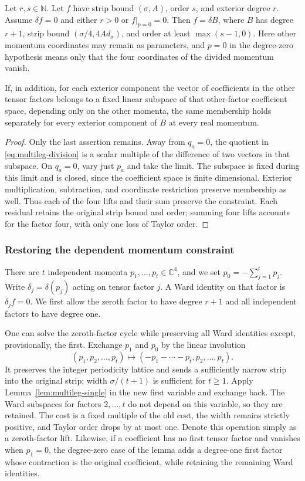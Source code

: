 \begin{lemma}\label{lem:multileg-single}
Let $r,s\in\mathbb N$. Let $f$ have strip bound $(\sigma,A)$,
order $s$, and exterior degree $r$. Assume $\delta f=0$ and either $r>0$ or $f|_{p=0}=0$.
Then $f=\delta B$, where $B$ has degree $r+1$, strip bound
$(\sigma/4,4Ad_\sigma)$, and order at least $\max(s-1,0)$.
Here other momentum coordinates may remain as parameters, and
$p=0$ in the degree-zero hypothesis means only that the four
coordinates of the divided momentum vanish.

If, in addition, for each exterior component the vector of
coefficients in the other tensor factors belongs to a fixed
linear subspace of that other-factor coefficient space, depending
only on the other momenta, the same membership holds separately
for every exterior component of $B$ at every real momentum.
\end{lemma}
\begin{proof}
Only the last assertion remains. Away from $q_a=0$, the quotient
in \eqref{eq:multileg-division} is a scalar multiple of the
difference of two vectors in that subspace. On $q_a=0$, vary just
$p_a$ and take the limit. The subspace is fixed during this limit
and is closed, since the coefficient space is finite dimensional.
Exterior multiplication, subtraction, and coordinate restriction
preserve membership as well. Thus each of the four lifts and
their sum preserve the constraint. Each residual retains the
original strip bound and order; summing four lifts accounts for
the factor four, with only one loss of Taylor order.
\end{proof}

\subsubsection{Restoring the dependent momentum constraint}
There are $t$ independent momenta $p_1,\ldots,p_t\in\mathbb C^4$,
and we set $p_0=-\sum_{j=1}^t p_j$. Write $\delta_j=\delta(p_j)$
acting on tensor factor $j$. A Ward identity on that factor is
$\delta_j f=0$. We first allow the zeroth factor to have degree
$r+1$ and all independent factors to have degree one.

One can solve the zeroth-factor cycle while preserving all Ward
identities except, provisionally, the first. Exchange $p_1$ and
$p_0$ by the linear involution
\[
 (p_1,p_2,\ldots,p_t)\longmapsto
             (-p_1-\cdots-p_t,p_2,\ldots,p_t).
\]
It preserves the integer periodicity lattice and sends a sufficiently
narrow strip into the original strip; width $\sigma/(t+1)$ is
sufficient for $t\ge1$. Apply Lemma~\ref{lem:multileg-single}
in the new first variable and exchange back. The Ward subspaces
for factors $2,\ldots,t$ do not depend on this variable, so they
are retained. The cost is a fixed multiple of the old cost,
the width remains strictly positive, and Taylor order drops by
at most one. Denote this operation simply as a zeroth-factor lift.
Likewise, if a coefficient has no first tensor factor and vanishes
when $p_1=0$, the degree-zero case of the lemma adds a degree-one
first factor whose contraction is the original coefficient,
while retaining the remaining Ward identities.


